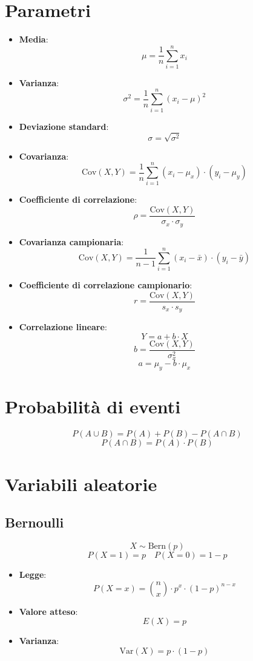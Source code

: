 \documentclass[a4paper]{article}
\theoremstyle{break}
\theoremstyle{break}
\theoremstyle{break}
\theoremstyle{break}
\begin{document}
\section{Parametri}
\begin{itemize}
  \item \textbf{Media}:
    \[
      \mu = \frac{1}{n} \sum_{i=1}^{n} x_{i}
    \]
  \item \textbf{Varianza}:
    \[
      \sigma^{2} = \frac{1}{n} \sum_{i=1}^{n} (x_{i} - \mu)^{2}
    \]
  \item \textbf{Deviazione standard}:
    \[
      \sigma = \sqrt{\sigma^{2}}
    \]
  \item \textbf{Covarianza}:
    \[
      \text{Cov}(X, Y) = \frac{1}{n} \sum_{i=1}^{n} (x_{i} - \mu_{x}) \cdot (y_{i} - \mu_{y})
    \]
  \item \textbf{Coefficiente di correlazione}:
    \[
      \rho = \frac{\text{Cov}(X, Y)}{\sigma_{x} \cdot \sigma_{y}}
    \]
  \item \textbf{Covarianza campionaria}:
    \[
      \text{Cov}(X, Y) = \frac{1}{n-1} \sum_{i=1}^{n} (x_{i} - \bar{x}) \cdot (y_{i} - \bar{y})
    \]
  \item \textbf{Coefficiente di correlazione campionario}:
    \[
      r = \frac{\text{Cov}(X, Y)}{s_{x} \cdot s_{y}}
    \]
  \item \textbf{Correlazione lineare}:
    \[
      Y = a + b \cdot X
    \]
    \[
      b = \frac{\text{Cov}(X, Y)}{\sigma^{2}_{x}}
    \]
    \[
      a = \mu_{y} - b \cdot \mu_{x}
    \]
\end{itemize}
\section{Probabilità di eventi}
\[
P(A \cup B) = P(A) + P(B) - P(A \cap B)
\] 
\[
P(A \cap B) = P(A) \cdot P(B)
\] 

\section{Variabili aleatorie}
\subsection{Bernoulli}
\[
  X \sim \text{Bern}(p)
\] 
\[
P(X = 1) = p \quad P(X = 0) = 1 - p
\] 
\begin{itemize}
  \item \textbf{Legge}:
    \[
      P(X = x) = \binom{n}{x} \cdot p^{x} \cdot (1-p)^{n-x}
    \] 
  \item \textbf{Valore atteso}:
    \[
      E(X) = p
    \]
  \item \textbf{Varianza}:
    \[
      \text{Var}(X) = p \cdot (1-p)
    \]
\end{itemize}
\end{document}
